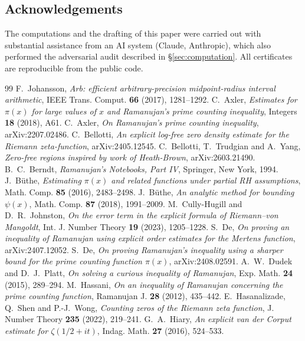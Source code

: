 \documentclass[11pt]{amsart}
\numberwithin{equation}{section}
\theoremstyle{definition}
\theoremstyle{remark}
\begin{document}
\subsection*{Acknowledgements}
The computations and the drafting of this paper were carried out with substantial assistance from an AI system (Claude, Anthropic), which also performed the adversarial audit described in \S\ref{sec:computation}.
All certificates are reproducible from the public code.
\begin{thebibliography}{99}
 F.~Johansson, \emph{Arb: efficient arbitrary-precision midpoint-radius interval arithmetic}, IEEE Trans. Comput. \textbf{66} (2017), 1281--1292.
 C.~Axler, \emph{Estimates for $\pi(x)$ for large values of $x$ and Ramanujan's prime counting inequality}, Integers \textbf{18} (2018), A61.
 C.~Axler, \emph{On Ramanujan's prime counting inequality}, arXiv:2207.02486.
 C.~Bellotti, \emph{An explicit log-free zero density estimate for the Riemann zeta-function}, arXiv:2405.12545.
 C.~Bellotti, T.~Trudgian and A.~Yang, \emph{Zero-free regions inspired by work of Heath-Brown}, arXiv:2603.21490.
 B.~C.~Berndt, \emph{Ramanujan's Notebooks, Part IV}, Springer, New York, 1994.
 J.~B\"uthe, \emph{Estimating $\pi(x)$ and related functions under partial RH assumptions}, Math. Comp. \textbf{85} (2016), 2483--2498.
 J.~B\"uthe, \emph{An analytic method for bounding $\psi(x)$}, Math. Comp. \textbf{87} (2018), 1991--2009.
 M.~Cully-Hugill and D.~R.~Johnston, \emph{On the error term in the explicit formula of Riemann--von Mangoldt}, Int. J. Number Theory \textbf{19} (2023), 1205--1228.
 S.~De, \emph{On proving an inequality of Ramanujan using explicit order estimates for the Mertens function}, arXiv:2407.12052.
 S.~De, \emph{On proving Ramanujan's inequality using a sharper bound for the prime counting function $\pi(x)$}, arXiv:2408.02591.
 A.~W.~Dudek and D.~J.~Platt, \emph{On solving a curious inequality of Ramanujan}, Exp. Math. \textbf{24} (2015), 289--294.
 M.~Hassani, \emph{On an inequality of Ramanujan concerning the prime counting function}, Ramanujan J. \textbf{28} (2012), 435--442.
 E.~Hasanalizade, Q.~Shen and P.-J.~Wong, \emph{Counting zeros of the Riemann zeta function}, J. Number Theory \textbf{235} (2022), 219--241.
 G.~A.~Hiary, \emph{An explicit van der Corput estimate for $\zeta(1/2+it)$}, Indag. Math. \textbf{27} (2016), 524--533.

\end{thebibliography}
\end{document}
